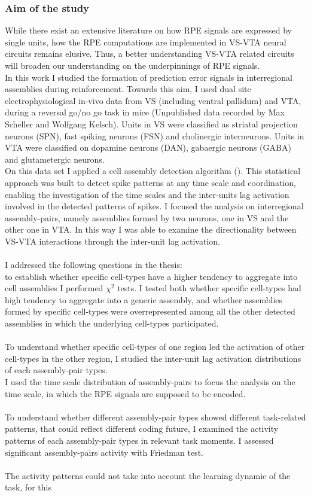 \subsubsection{Aim of the study}
While there exist an extensive literature on how RPE signals are expressed by single units, how the RPE computations are implemented in VS-VTA neural circuits remains elusive. Thus, a better understanding VS-VTA related circuits will broaden our understanding on the underpinnings of RPE signals.\\In this work I studied the formation of prediction error signals in interregional assemblies during reinforcement. Towards this aim, I used dual site electrophysiological in-vivo data from VS (including ventral pallidum) and VTA, during a reversal go/no go task in mice (Unpublished data recorded by Max Scheller and Wolfgang Kelsch). Units in VS were classified as striatal projection neurons (SPN), fast spiking neurons (FSN) and cholinergic interneurons. Units in VTA were classified on dopamine neurons (DAN), gabaergic neurons (GABA) and glutametergic neurons.\\On this data set I applied a cell assembly detection algorithm (\cite{RussoDurstewitz}). This statistical approach was built to detect spike patterns at any time scale and coordination, enabling the investigation of the time scales and the inter-units lag activation involved in the detected patterns of spikes. I focused the analysis on interregional assembly-pairs, namely assemblies formed by two neurons, one in VS and the other one in VTA. In this way I was able to examine the directionality between VS-VTA interactions through the inter-unit lag activation.\\\\I addressed the following questions in the thesis:\\to establish whether specific cell-types have a higher tendency to aggregate into cell assemblies I performed $\chi^2$ tests. I tested both whether specific cell-types had high tendency to aggregate into a generic assembly, and whether assemblies formed by specific cell-types were overrepresented among all the other detected assemblies in which the underlying cell-types participated.\\\\To understand whether specific cell-types of one region led the activation of other cell-types in the other region, I studied the inter-unit lag activation distributions of each assembly-pair types.\\I used the time scale distribution of assembly-pairs to focus the analysis on the time scale, in which the RPE signals are supposed to be encoded.\\\\To understand whether different assembly-pair types showed different task-related patterns, that could reflect different coding future, I examined the activity patterns of each assembly-pair types in relevant task moments. I assessed significant assembly-pairs activity with Friedman test.\\\\The activity patterns could not take into account the learning dynamic of the task, for this 